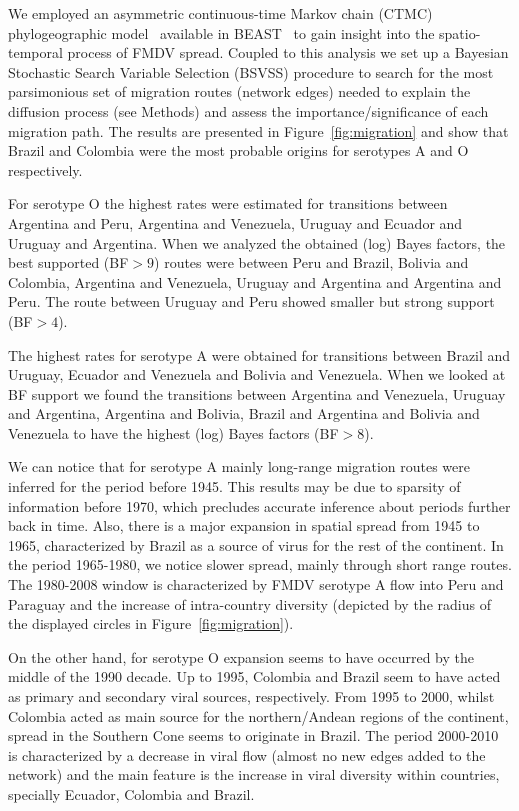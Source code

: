 \documentclass[10pt]{article}
\begin{document}
We employed an asymmetric continuous-time Markov chain (CTMC) phylogeographic model~\cite{roots} available in BEAST~\cite{beast2012} to gain insight into the spatio-temporal process of FMDV spread.
Coupled to this analysis we set up a Bayesian Stochastic Search Variable Selection (BSVSS) procedure to search for the most parsimonious set of migration routes (network edges) needed to explain the diffusion process (see Methods) and assess the importance/significance of each migration path.
The results are presented in Figure~\ref{fig:migration} and show that Brazil and Colombia were the most probable origins for serotypes A and O respectively.

For serotype O the highest rates were estimated for transitions between Argentina and Peru, Argentina and Venezuela, Uruguay and Ecuador and Uruguay and Argentina.
When we analyzed the obtained (log) Bayes factors, the best supported (BF$>9$) routes were between Peru and Brazil, Bolivia and Colombia, Argentina and Venezuela, Uruguay and Argentina and Argentina and Peru. The route between Uruguay and Peru showed smaller but strong support (BF$>4$).

The highest rates for serotype A were obtained for transitions between Brazil and Uruguay, Ecuador and Venezuela and Bolivia and Venezuela.
When we looked at BF support we found the transitions between Argentina and Venezuela, Uruguay and Argentina, Argentina and Bolivia, Brazil and Argentina and Bolivia and Venezuela to have the highest (log) Bayes factors (BF$>8$).

We can notice that for serotype A mainly long-range migration routes were inferred for the period before 1945.
This results may be due to sparsity of information before 1970, which precludes accurate inference about periods further back in time. 
Also, there is a major expansion in spatial spread from 1945 to 1965, characterized by Brazil as a source of virus for the rest of the continent.
In the period 1965-1980, we notice slower spread, mainly through short range routes.
The 1980-2008 window is characterized by FMDV serotype A flow into Peru and Paraguay and the increase of intra-country diversity (depicted by the radius of the displayed circles in Figure~\ref{fig:migration}).   

On the other hand, for serotype O expansion seems to have occurred by the middle of the 1990 decade.
Up to 1995, Colombia and Brazil seem to have acted as primary and secondary viral sources, respectively.
From 1995 to 2000, whilst Colombia acted as main source for the northern/Andean regions of the continent, spread in the Southern Cone seems to originate in Brazil.
The period 2000-2010 is characterized by a decrease in viral flow (almost no new edges added to the network) and the main feature is the increase in viral diversity within countries, specially Ecuador, Colombia and Brazil.
\end{document}
